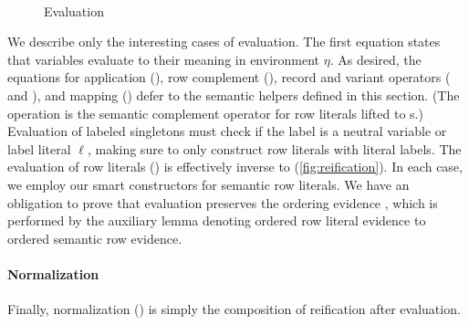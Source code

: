 \documentclass[sigplan,screen]{acmart}
\begin{document}
\begin{figure}[t]
\begin{AgdaAlign}
\begin{code}[hide]
\AgdaSpace{}%
\AgdaSpace{}%
\AgdaSymbol{)}\<%
\\
%
\>[2]\AgdaSpace{}%
\AgdaSymbol{(}\AgdaSpace{}%
\AgdaSymbol{)}\AgdaSpace{}%
\AgdaSpace{}%
\AgdaSpace{}%
\AgdaSymbol{=}\AgdaSpace{}%
\AgdaSpace{}%
\AgdaSpace{}%
\AgdaSpace{}%
\AgdaSpace{}%
\AgdaSpace{}%
\AgdaSpace{}%
\AgdaSpace{}%
\AgdaSymbol{(}\AgdaSpace{}%
\AgdaSymbol{(}\AgdaSpace{}%
\AgdaSpace{}%
\AgdaSpace{}%
\AgdaSymbol{)}\AgdaSpace{}%
\AgdaSymbol{)}\<%
\end{code}
\end{AgdaAlign}
\caption{Evaluation}
\label{fig:evaluation}
\end{figure}

We describe only the interesting cases of evaluation. The first equation states that variables evaluate to their meaning in environment $\eta$. As desired, the equations for application (), row complement (), record and variant operators ( and ), and mapping (\Constructor{\Underscore{}\$\Underscore{}}) defer to the semantic helpers defined in this section. (The operation  is the semantic complement operator for row literals lifted to s.) Evaluation of labeled singletons must check if the label is a neutral variable  or label literal $\ell$, making sure to only construct row literals with literal labels. The evaluation of row literals () is effectively inverse to  (\cref{fig:reification}). In each case, we employ our smart constructors for semantic row literals. We have an obligation to prove that evaluation preserves the ordering evidence , which is performed by the auxiliary lemma  denoting ordered row literal evidence to ordered semantic row evidence.

\paragraph{Normalization} Finally, normalization () is simply the composition of reification after evaluation.  
\end{document}
